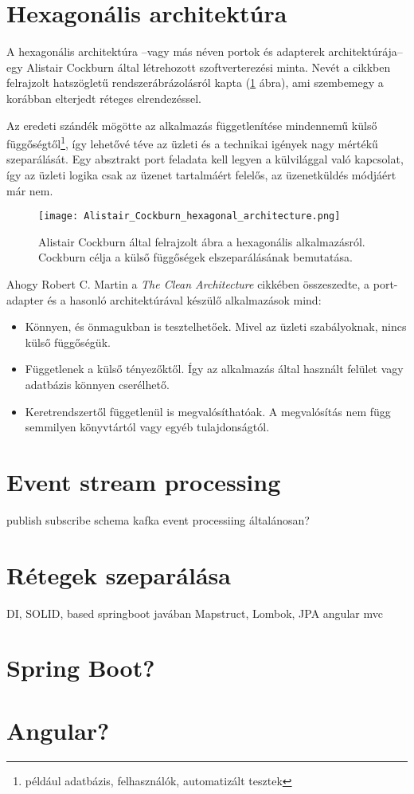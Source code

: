 \section{Hexagonális architektúra}
A hexagonális architektúra --vagy más néven portok és adapterek architektúrája-- egy \foreignlanguage{british}{Alistair Cockburn} által létrehozott \cite{Alistair_Cockburn} szoftverterezési minta. Nevét a cikkben felrajzolt hatszögletű rendszerábrázolásról kapta (\ref{fig:Alistair_Cockburn_hexagonal_architecture} ábra), ami szembemegy a korábban elterjedt réteges elrendezéssel.

Az eredeti szándék mögötte az alkalmazás függetlenítése mindennemű külső függőségtől\footnote{például adatbázis, felhasználók, automatizált tesztek}, így lehetővé téve az üzleti és a technikai igények nagy mértékű szeparálását.
Egy absztrakt port feladata kell legyen a külvilággal való kapcsolat, így az üzleti logika csak az üzenet tartalmáért felelős, az üzenetküldés módjáért már nem.

\begin{figure}[hbt] 
	\centering
		\texttt{[image: Alistair\_Cockburn\_hexagonal\_architecture.png]}
	\caption[Hexagonális alkalmazások felépítése]{\foreignlanguage{british}{Alistair Cockburn} által \cite{Alistair_Cockburn} felrajzolt ábra a hexagonális alkalmazásról. Cockburn célja a külső függőségek elszeparálásának bemutatása.
}\label{fig:Alistair_Cockburn_hexagonal_architecture}
\end{figure}

Ahogy \foreignlanguage{british}{Robert C. Martin} a \foreignlanguage{british}{\textit{The Clean Architecture}} cikkében \cite{The_Clean_Architecture} összeszedte, a port-adapter és a hasonló architektúrával készülő alkalmazások mind:	
\begin{itemize}
	\item Könnyen, és önmagukban is tesztelhetőek. Mivel az üzleti szabályoknak, nincs külső függőségük.
	
	\item Függetlenek a külső tényezőktől. Így az alkalmazás által használt felület vagy adatbázis könnyen cserélhető.
	
	\item Keretrendszertől függetlenül is megvalósíthatóak. A megvalósítás nem függ semmilyen könyvtártól vagy egyéb tulajdonságtól.
\end{itemize}
	
	

\section{Event stream processing}
publish subscribe
 schema
 kafka
event processiing általánosan?


\section{Rétegek szeparálása}\label{sec:retegek_szeparalasa}
	DI, SOLID,
based springboot  javában 	Mapstruct, 	Lombok,  JPA
angular mvc		


\section{Spring Boot?}
\section{Angular?}

